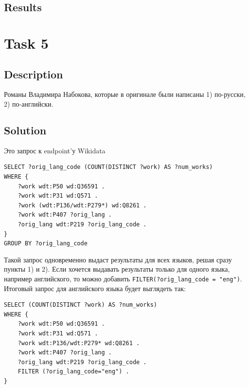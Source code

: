 \documentclass{article}
\begin{document}
\subsection*{Results}

\noindent{}

\section*{Task 5}

\subsection*{Description}
Романы Владимира Набокова, которые в оригинале были написаны 1) по-русски, 2) по-английски. 
\subsection*{Solution}
Это запрос к endpoint'у Wikidata

\begin{verbatim}
SELECT ?orig_lang_code (COUNT(DISTINCT ?work) AS ?num_works)
WHERE {
    ?work wdt:P50 wd:Q36591 .
    ?work wdt:P31 wd:Q571 .
    ?work (wdt:P136/wdt:P279*) wd:Q8261 .
    ?work wdt:P407 ?orig_lang .
    ?orig_lang wdt:P219 ?orig_lang_code .
}
GROUP BY ?orig_lang_code
\end{verbatim}

Такой запрос одновременно выдаст результаты для всех языков, решая сразу пункты 1) и 2). Если хочется
выдавать результаты только для одного языка, например английского, то можно добавить \texttt{FILTER(?orig\_lang\_code = "eng")}. 
Итоговый запрос для английского языка будет выглядеть так:

\begin{verbatim}
SELECT (COUNT(DISTINCT ?work) AS ?num_works)
WHERE {
    ?work wdt:P50 wd:Q36591 .
    ?work wdt:P31 wd:Q571 .
    ?work wdt:P136/wdt:P279* wd:Q8261 .
    ?work wdt:P407 ?orig_lang .
    ?orig_lang wdt:P219 ?orig_lang_code .
    FILTER (?orig_lang_code="eng") .
}
\end{verbatim}
\end{document}
